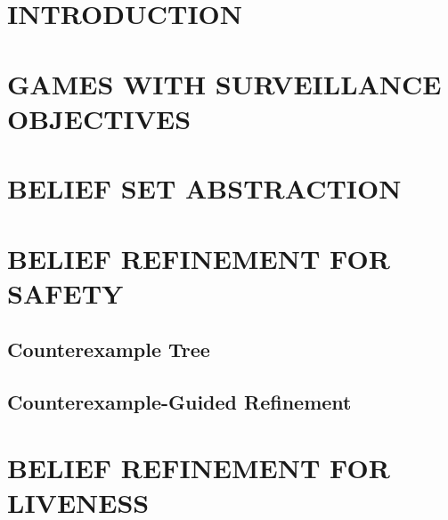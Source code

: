 \documentclass[letterpaper, 10 pt, conference]{ieeeconf}  %
\begin{document}

\section{INTRODUCTION}




\section{GAMES WITH SURVEILLANCE OBJECTIVES}



\section{BELIEF SET ABSTRACTION}






\section{BELIEF REFINEMENT FOR SAFETY}%
\subsection{Counterexample Tree}

\subsection{Counterexample-Guided Refinement}



\section{BELIEF REFINEMENT FOR LIVENESS}%
\end{document}
